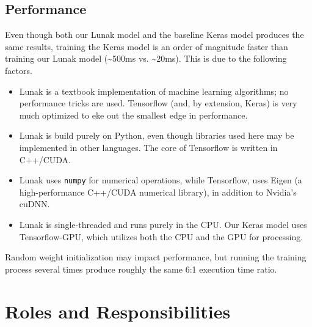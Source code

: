 \documentclass[11pt]{article}
\providecommand{\tightlist}{%
      \setlength{\itemsep}{0pt}\setlength{\parskip}{0pt}}
\begin{document}
\hypertarget{performance}{%
\subsection{Performance}\label{performance}}

Even though both our Lunak model and the baseline Keras model produces
the same results, training the Keras model is an order of magnitude
faster than training our Lunak model (\textasciitilde{}500ms vs.
\textasciitilde{}20ms). This is due to the following factors.

\begin{itemize}
\tightlist
\item
  Lunak is a textbook implementation of machine learning algorithms; no
  performance tricks are used. Tensorflow (and, by extension, Keras) is
  very much optimized to eke out the smallest edge in performance.
\item
  Lunak is build purely on Python, even though libraries used here may
  be implemented in other languages. The core of Tensorflow is written
  in C++/CUDA.
\item
  Lunak uses \texttt{numpy} for numerical operations, while Tensorflow,
  uses Eigen (a high-performance C++/CUDA numerical library), in
  addition to Nvidia's cuDNN.
\item
  Lunak is single-threaded and runs purely in the CPU. Our Keras model
  uses Tensorflow-GPU, which utilizes both the CPU and the GPU for
  processing.
\end{itemize}

Random weight initialization may impact performance, but running the
training process several times produce roughly the same 6:1 execution
time ratio.

    \hypertarget{roles-and-responsibilities}{%
\section{Roles and Responsibilities}\label{roles-and-responsibilities}}
\end{document}
